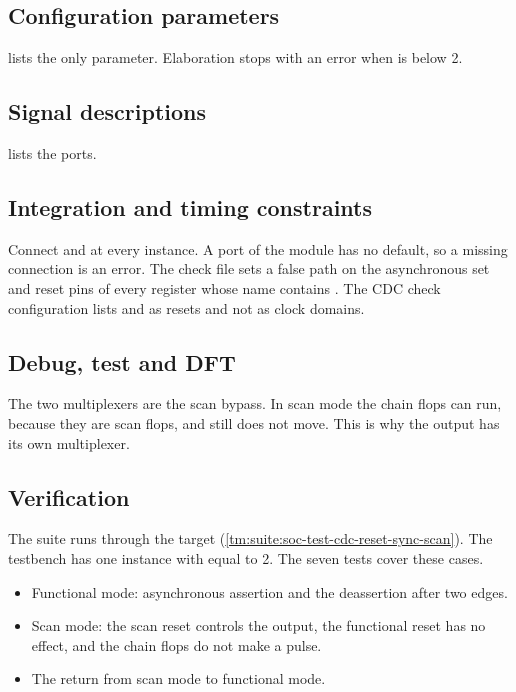 \subsection{Configuration parameters}
 lists the only parameter. Elaboration stops with an error when  is below 2.



\subsection{Signal descriptions}
 lists the ports.



\subsection{Integration and timing constraints}
Connect  and  at every instance. A port of the module has no default, so a missing connection is an error. The check file sets a false path on the asynchronous set and reset pins of every register whose name contains . The CDC check configuration lists  and  as resets and not as clock domains.

\subsection{Debug, test and DFT}
The two multiplexers are the scan bypass. In scan mode the chain flops can run, because they are scan flops, and  still does not move. This is why the output has its own multiplexer.

\subsection{Verification}
The suite  runs through the target  (\cref{tm:suite:soc-test-cdc-reset-sync-scan}). The testbench has one instance with  equal to 2. The seven tests cover these cases.
\begin{itemize}
  \item Functional mode: asynchronous assertion and the deassertion after two edges.
  \item Scan mode: the scan reset controls the output, the functional reset has no effect, and the chain flops do not make a pulse.
  \item The return from scan mode to functional mode.
\end{itemize}

